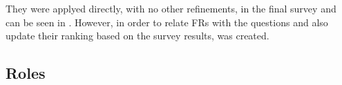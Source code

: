 




They were applyed directly, with no other refinements, in the final survey and can be seen in .
However, in order to relate \acp{FR} with the questions and also update their ranking based on the survey results,  was created.



\subsection{Roles}\label{ext:roles}

